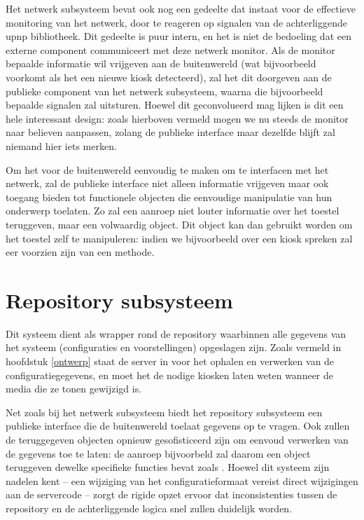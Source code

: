 Het netwerk subsysteem bevat ook nog een gedeelte dat instaat voor de effectieve monitoring van het netwerk, door te reageren op signalen van de achterliggende \ac{upnp} bibliotheek. Dit gedeelte is puur intern, en het is niet de bedoeling dat een externe component communiceert met deze netwerk monitor. Als de monitor bepaalde informatie wil vrijgeven aan de buitenwereld (wat bijvoorbeeld voorkomt als het een nieuwe kiosk detecteerd), zal het dit doorgeven aan de publieke component van het netwerk subsysteem, waarna die bijvoorbeeld bepaalde signalen zal uitsturen. Hoewel dit geconvolueerd mag lijken is dit een hele interessant design: zoals hierboven vermeld mogen we nu steeds de monitor naar believen aanpassen, zolang de publieke interface maar dezelfde blijft zal niemand hier iets merken.

Om het voor de buitenwereld eenvoudig te maken om te interfacen met het netwerk, zal de publieke interface niet alleen informatie vrijgeven maar ook toegang bieden tot functionele objecten die eenvoudige manipulatie van hun onderwerp toelaten. Zo zal een  aanroep niet louter informatie over het toestel teruggeven, maar een volwaardig  object. Dit object kan dan gebruikt worden om het toestel zelf te manipuleren: indien we bijvoorbeeld over een kiosk spreken zal eer voorzien zijn van een  methode.

\section{Repository subsysteem}

Dit systeem dient als wrapper rond de repository waarbinnen alle gegevens van het systeem (configuraties en voorstellingen) opgeslagen zijn. Zoals vermeld in hoofdstuk \ref{ontwerp} staat de server in voor het ophalen en verwerken van de configuratiegegevens, en moet het de nodige kiosken laten weten wanneer de media die ze tonen gewijzigd is.

Net zoals bij het netwerk subsysteem biedt het repository subsysteem een publieke interface die de buitenwereld toelaat gegevens op te vragen. Ook zullen de teruggegeven objecten opnieuw gesofisticeerd zijn om eenvoud verwerken van de gegevens toe te laten: de  aanroep bijvoorbeld zal daarom een  object teruggeven dewelke specifieke functies bevat zoals . Hoewel dit systeem zijn nadelen kent -- een wijziging van het configuratieformaat vereist direct wijzigingen aan de servercode -- zorgt de rigide opzet ervoor dat inconsistenties tussen de repository en de achterliggende logica snel zullen duidelijk worden. 

